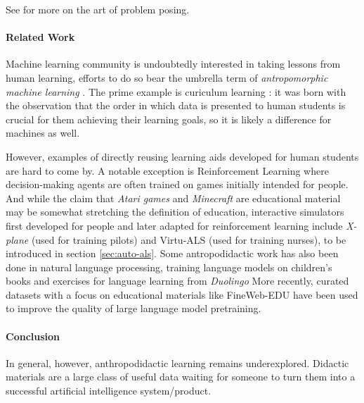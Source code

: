 See \cite{brownArtProblemPosing2005} for more on the art of problem posing.

\paragraph{Related Work}

Machine learning community is undoubtedly interested in taking lessons from human learning, efforts to do so bear the umbrella term of \emph{antropomorphic
machine learning} \cite{angelovAnthropomorphicMachineLearning2018}. The prime example is curiculum learning \cite{sovianyCurriculumLearningSurvey2022, zhouCurBenchCurriculumLearning2024}: it was born with the observation that the order in which data is presented to human students is crucial for them achieving their learning goals, so it is likely a difference for machines as well.

However, examples of directly reusing learning aids developed for human students are hard to come by. A notable exception is Reinforcement Learning where decision-making agents are often trained on games initially intended for people. And while the claim that \emph{Atari games} \cite{mnihPlayingAtariDeep2013} and 
\emph{Minecraft} \cite{hofmannMinecraftAIPlayground2019} are educational material may be somewhat stretching the definition of education, interactive simulators first developed for people and later adapted for reinforcement learning include \emph{X-plane} \cite{staudingerXPlaneMLEnvironmentLearning2018} (used for training pilots) and Virtu-ALS (used for training nurses), to be introduced in section \ref{sec:auto-als}. 
Some antropodidactic work has also been done in natural language processing, training language models on children's books \cite{mayhewSimultaneousTranslationParaphrase2020} and exercises for language learning from \emph{Duolingo} \cite{mayhewSimultaneousTranslationParaphrase2020}
More recently, curated datasets with a focus on educational materials like FineWeb-EDU \cite{penedoFineWebDatasetsDecanting2024} have been used to improve the quality of large language model pretraining.

\paragraph{Conclusion}

In general, however, anthropodidactic learning remains underexplored. 
Didactic materials are a large class of useful data waiting for someone to turn them into a successful artificial intelligence system/product.


